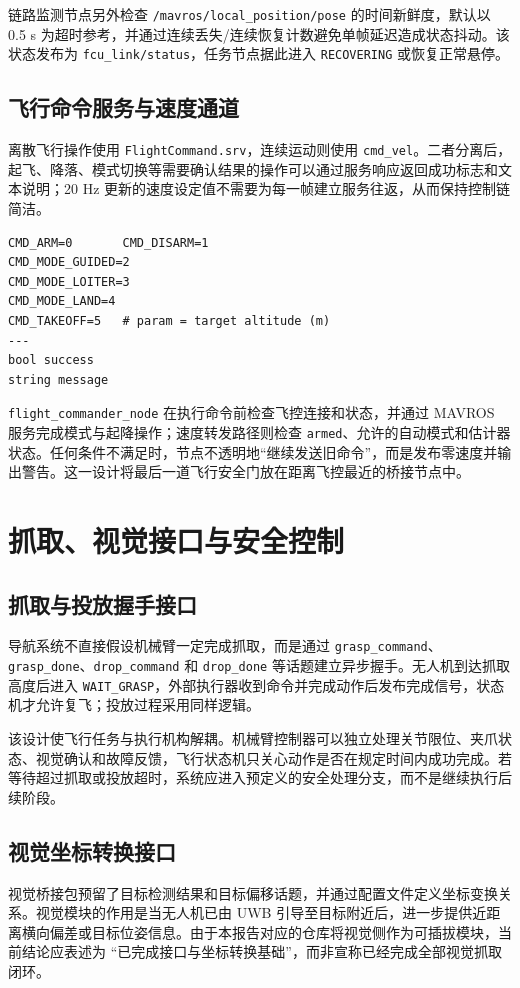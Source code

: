 \documentclass[12pt,a4paper]{ctexart}
\providecommand{\allowbreak}{\penalty0\relax}
\begin{document}
链路监测节点另外检查 \texttt{/mavros/}\allowbreak\texttt{local\_position/}\allowbreak\texttt{pose} 的时间新鲜度，默认以 0.5 s 为超时参考，并通过连续丢失/连续恢复计数避免单帧延迟造成状态抖动。该状态发布为 \texttt{fcu\_link/status}，任务节点据此进入 \texttt{RECOVERING} 或恢复正常悬停。

\subsection{飞行命令服务与速度通道}
离散飞行操作使用 \texttt{FlightCommand.srv}，连续运动则使用 \texttt{cmd\_vel}。二者分离后，起飞、降落、模式切换等需要确认结果的操作可以通过服务响应返回成功标志和文本说明；20 Hz 更新的速度设定值不需要为每一帧建立服务往返，从而保持控制链简洁。

\begin{verbatim}
CMD_ARM=0       CMD_DISARM=1
CMD_MODE_GUIDED=2
CMD_MODE_LOITER=3
CMD_MODE_LAND=4
CMD_TAKEOFF=5   # param = target altitude (m)
---
bool success
string message
\end{verbatim}

\texttt{flight\_commander\_node} 在执行命令前检查飞控连接和状态，并通过 MAVROS 服务完成模式与起降操作；速度转发路径则检查 \texttt{armed}、允许的自动模式和估计器状态。任何条件不满足时，节点不透明地“继续发送旧命令”，而是发布零速度并输出警告。这一设计将最后一道飞行安全门放在距离飞控最近的桥接节点中。

\clearpage
\section{抓取、视觉接口与安全控制}
\subsection{抓取与投放握手接口}
导航系统不直接假设机械臂一定完成抓取，而是通过 \texttt{grasp\_command}、\texttt{grasp\_done}、\texttt{drop\_command} 和 \texttt{drop\_done} 等话题建立异步握手。无人机到达抓取高度后进入 \texttt{WAIT\_GRASP}，外部执行器收到命令并完成动作后发布完成信号，状态机才允许复飞；投放过程采用同样逻辑。

该设计使飞行任务与执行机构解耦。机械臂控制器可以独立处理关节限位、夹爪状态、视觉确认和故障反馈，飞行状态机只关心动作是否在规定时间内成功完成。若等待超过抓取或投放超时，系统应进入预定义的安全处理分支，而不是继续执行后续阶段。

\subsection{视觉坐标转换接口}
视觉桥接包预留了目标检测结果和目标偏移话题，并通过配置文件定义坐标变换关系。视觉模块的作用是当无人机已由 UWB 引导至目标附近后，进一步提供近距离横向偏差或目标位姿信息。由于本报告对应的仓库将视觉侧作为可插拔模块，当前结论应表述为 ``已完成接口与坐标转换基础''，而非宣称已经完成全部视觉抓取闭环。
\end{document}
